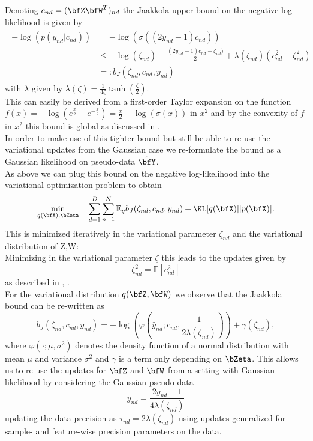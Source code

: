Denoting $c_{nd}=(\bfZ\bfW^T)_{nd}$ the Jaakkola upper bound \cite{Jaakkola2000} on the negative log-likelihood is given by
\begin{align*}
\begin{split}
-\log\left(p(y_{nd}|c_{nd})\right) &= -\log\left(\sigma\left((2y_{nd}-1)  c_{nd}\right)\right)\\
& \leq -\log(\zeta_{nd})-\frac{(2y_{nd}-1)c_{nd}-\zeta_{nd})}{2} +\lambda(\zeta_{nd})\left(c_{nd}^2 -\zeta_{nd}^2 \right)\\
& =: b_J(\zeta_{nd}, c_{nd},y_{nd} )
\label{jaakkola}
\end{split}
\end{align*}
with $\lambda$ given by $\lambda(\zeta)=\frac{1}{4\zeta}\tanh\left(\frac{\zeta}{2}\right)$.\\
This can easily be derived from a first-order Taylor expansion on the function $f(x) = - \log(e^{\frac{x}{2}}+e^{-\frac{x}{2}}) = \frac{x}{2}-\log(\sigma(x))$ in $x^2$ and by the convexity of 
$f$ in $x^2$ this bound is global as discussed in \cite{Jaakkola2000}.\\
In order to make use of this tighter bound but still be able to re-use the variational updates from the Gaussian case we re-formulate the bound as a Gaussian likelihood on pseudo-data $\hat{\bfY}$.\\
As above we can plug this bound on the negative log-likelihood into the variational optimization problem to obtain  \begin{equation*}
\min_{q(\bfX),\bZeta} \quad \sum_{d=1}^{D}\sum_{n=1}^{N} \mathbb{E}_q b_J(\zeta_{nd}, c_{nd},y_{nd} ) + \KL[q(\bfX)||p(\bfX)].
\end{equation*}
This is minimized iteratively in the variational parameter $\zeta_{nd}$ and the variational distribution of Z,W:\\
Minimizing in the variational parameter $\zeta$ this leads to the updates given by
\begin{equation*}
\zeta_{nd}^2 = \mathbb{E}[c_{nd}^2]
\end{equation*}
as described in \cite{Jaakkola2000}, \cite{Bishop}.\\
For the variational distribution $q(\bfZ,\bfW)$ we observe that the Jaakkola bound can be re-written as 
\begin{equation*}
b_J(\zeta_{nd}, c_{nd},y_{nd} ) = -\log\left(\varphi\left(\hat{y}_{nd}; c_{nd}, \frac{1}{2\lambda(\zeta_{nd})}\right)\right) + \gamma(\zeta_{nd}),
\end{equation*}
where $\varphi(\cdot; \mu, \sigma^2)$ denotes the density function of a normal distribution with mean $\mu$ and variance $\sigma^2$ and $\gamma$ is a term only depending on $\bZeta$. This allows us to re-use the updates for $\bfZ$ and $\bfW$ from a setting with Gaussian likelihood by considering the Gaussian pseudo-data 
\begin{equation*}
\hat{y}_{nd}= \frac{2y_{nd}-1}{4 \lambda(\zeta_{nd})}
\end{equation*}
updating the data precision as $\tau_{nd} = 2\lambda(\zeta_{nd})$ using  updates generalized for sample- and feature-wise precision parameters on the data.


